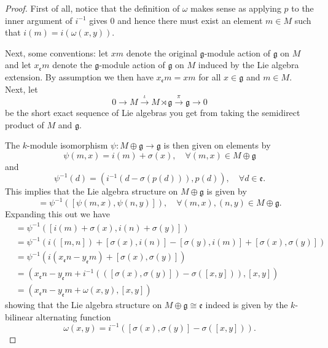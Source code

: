 \begin{proof}
  First of all, notice that the definition of $ \omega $ makes sense as applying $ p $ to the inner argument of $ i^{-1} $ gives $ 0 $ and hence there must exist an element $ m \in M $ such that $ i(m)=i(\omega(x,y)) $.

  Next, some conventions: let $ xm $ denote the original $ \mathfrak{g} $-module action of $ \mathfrak{g} $ on $ M $ and let $ x_{\mathfrak{e}} m $ denote the $ \mathfrak{g} $-module action of $ \mathfrak{g} $ on $ M $ induced by the Lie algebra extension. By assumption we then have $ x_{\mathfrak{e}}m = xm $ for all $ x \in \mathfrak{g} $ and $ m \in M $. Next, let
  \begin{equation}
    0 \to M \xrightarrow{\iota} M \rtimes \mathfrak{g} \xrightarrow{\pi} \mathfrak{g} \to 0
  \end{equation}
  be the short exact sequence of Lie algebras you get from taking the semidirect product of $ M $ and $ \mathfrak{g} $.

  The $ k $-module isomorphism $ \psi: M \oplus \mathfrak{g} \to \mathfrak{g} $ is then given on elements by
  \begin{equation}
    \psi(m , x) = i(m) + \sigma(x),\quad \forall (m,x) \in M \oplus \mathfrak{g}
  \end{equation}
  and
  \begin{equation}
    \psi^{-1}(d) = (i^{-1}(d - \sigma(p(d))), p(d)), \quad \forall d \in \mathfrak{e}.
  \end{equation}
  This implies that the Lie algebra structure on $ M \oplus \mathfrak{g} $ is given by
  \begin{equation}
    [(m, x), (n, y)] = \psi^{-1}\left( [\psi(m, x), \psi(n, y)] \right),
    \quad \forall (m,x),(n,y) \in M \oplus \mathfrak{g}
  .\end{equation}
  Expanding this out we have
  \begin{align*}
    [(m, x), (n, y)] &= \psi^{-1}\left( [i(m) + \sigma(x),  i(n) + \sigma(y)] \right) \\
                     &= \psi^{-1}\left( i([m, n]) + [\sigma(x), i(n)] - [\sigma(y), i(m)] + [\sigma(x), \sigma(y)] \right) \\
                     &=\psi^{-1}\left( i(x_{\mathfrak{e}} n - y_{\mathfrak{e}} m ) + [\sigma(x), \sigma(y)] \right) \\
                     &= (x_{\mathfrak{e}}n - y_{\mathfrak{e}}m + i^{-1}(\left( [\sigma(x), \sigma(y)] \right) - \sigma([x, y])), [x, y])\\
                     &= (x_{\mathfrak{e}}n - y_{\mathfrak{e}}m +\omega(x,y), [x, y])
  \end{align*}
  showing that the Lie algebra structure on $ M \oplus \mathfrak{g} \cong \mathfrak{e} $ indeed is given by the $ k $-bilinear alternating function
  \begin{equation}
    \omega(x,y) = i^{-1}([\sigma(x), \sigma(y)] - \sigma([x,y])).
  \end{equation}


\end{proof}
